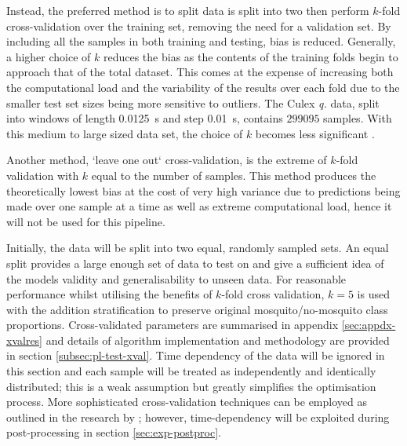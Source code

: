        Instead, the preferred method is to split data is split into two then perform $k$-fold cross-validation over the training set, removing the need for a validation set. By including all the samples in both training and testing, bias is reduced. Generally, a higher choice of $k$ reduces the bias as the contents of the training folds begin to approach that of the total dataset. This comes at the expense of increasing both the computational load and the variability of the results over each fold due to the smaller test set sizes being more sensitive to outliers. The Culex \textit{q.} data, split into windows of length \SI{0.0125}{\second} and step \SI{0.01}{\second}, contains $299095$ samples. With this medium to large sized data set, the choice of $k$ becomes less significant \cite{Kohavi1995}. 
        
        Another method, `leave one out` cross-validation, is the extreme of $k$-fold validation with $k$ equal to the number of samples. This method produces the theoretically lowest bias at the cost of very high variance due to predictions being made over one sample at a time as well as extreme computational load, hence it will not be used for this pipeline.

        Initially, the data will be split into two equal, randomly sampled sets. An equal split provides a large enough set of data to test on and give a sufficient idea of the models validity and generalisability to unseen data. For reasonable performance whilst utilising the benefits of $k$-fold cross validation, $k=5$ is used with the addition stratification to preserve original mosquito/no-mosquito class proportions. Cross-validated parameters are summarised in appendix \ref{sec:appdx-xvalres} and details of algorithm implementation and methodology are provided in section \ref{subsec:pl-test-xval}. Time dependency of the data will be ignored in this section and each sample will be treated as independently and identically distributed; this is a weak assumption but greatly simplifies the optimisation process. More sophisticated cross-validation techniques can be employed as outlined in the research by \textcite{Yang2001}; however, time-dependency will be exploited during post-processing in section \ref{sec:exp-postproc}.
        
        
    
        
     
